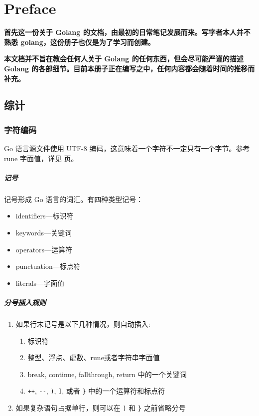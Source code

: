 
\chapter{Preface}
\textbf{首先这一份关于 Golang 的文档，由最初的日常笔记发展而来。写字者本人并不熟悉 golang，这份册子也仅是为了学习而创建。}

\textbf{本文档并不旨在教会任何人关于 Golang 的任何东西，但会尽可能严谨的描述 Golang 的各部细节。目前本册子正在编写之中，任何内容都会随着时间的推移而补充。}

\section{综计}
\subsection{字符编码}
Go 语言源文件使用 UTF-8 编码，这意味着一个字符不一定只有一个字节。参考 rune 字面值，详见 页\pageref{rune-literal}。

\paragraph{记号}
记号形成 Go 语言的词汇。有四种类型记号：
\begin{itemize}
	\item identifiers---标识符
	\item keywords---关键词
	\item operators---运算符
	\item punctuation---标点符
	\item literals---字面值
\end{itemize}

\paragraph{分号插入规则}
\begin{enumerate}
	\item  如果行末记号是以下几种情况，则自动插入:
	\begin{enumerate}
		\item 标识符
		\item 整型、浮点、虚数、rune或者字符串字面值
		\item  break, continue, fallthrough, return 中的一个关键词
		\item  \verb|++|, \verb|--|, \verb|)|, \verb|]|, 或者 \verb|}| 中的一个运算符和标点符
	\end{enumerate}
	\item  如果复杂语句占据单行，则可以在 \verb|)| 和 \verb|}| 之前省略分号
\end{enumerate}